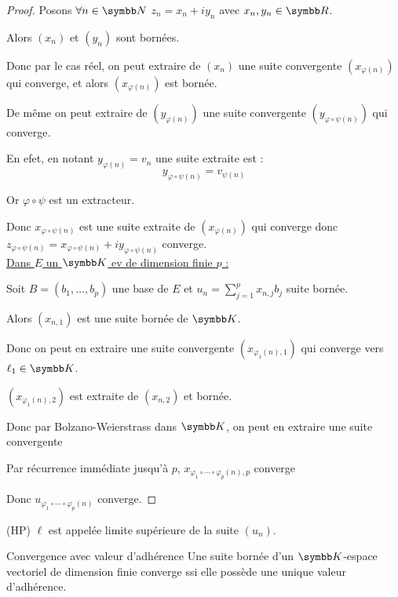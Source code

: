 \begin{proof}
    Posons $\forall n \in \N$ $z_n = x_n + i y_n$ avec $x_n, y_n \in \R$.

    Alors $(x_n)$ et $(y_n)$ sont bornées.

    Donc par le cas réel, on peut extraire de $(x_n)$ une suite convergente $(x_{\varphi(n)})$
    qui converge, et alors $(x_{\varphi(n)})$ est bornée. 

    De même on peut extraire de $(y_{\varphi(n)})$ une suite convergente $(y_{\varphi \circ \psi(n)})$ 
    qui converge. 

    En efet, en notant $y_{\varphi(n)} = v_n$ une suite extraite est :
    \[y_{\varphi \circ \psi(n)} = v_{\psi(n)}\]

    Or $\varphi \circ \psi$ est un extracteur.

    Donc $x_{\varphi \circ \psi(n)}$ est une suite extraite de $(x_{\varphi(n)})$ qui converge
    donc $z_{\varphi \circ \psi(n)} = x_{\varphi \circ \psi(n)} + i y_{\varphi \circ \psi(n)}$ converge. \\

    \uline{Dans $E$ un $\K$ ev de dimension finie $p$ :}

    \svspace Soit $B = (b_1, \dots, b_p)$ une base de $E$
    et $u_n = \sum_{j = 1}^{p} x_{n, j} b_j$ suite bornée. 

    Alors $(x_{n, 1})$ est une suite bornée de $\K$.    

    Donc on peut en extraire une suite convergente $(x_{\varphi_1(n), 1})$ 
    qui converge vers $\ell_1 \in \K$.

    $(x_{\varphi_1(n), 2})$ est extraite de $(x_{n, 2})$ et bornée.

    Donc par Bolzano-Weierstrass dans $\K$, on peut en extraire une suite convergente

    Par récurrence immédiate jusqu'à $p$,
    $x_{\varphi_1 \circ \cdots \circ \varphi_p(n), p}$ converge 

    Donc $u_{\varphi_1 \circ \cdots \circ \varphi_p(n)}$ converge. 
\end{proof}

\begin{remarque} (HP) $\ell$ est appelée limite supérieure de la suite $(u_n)$.
\end{remarque}

\begin{theoreme}{Convergence avec valeur d'adhérence}{}
    Une suite bornée d'un $\K$-espace vectoriel de dimension finie converge ssi elle possède
    une unique valeur d'adhérence.
\end{theoreme}

